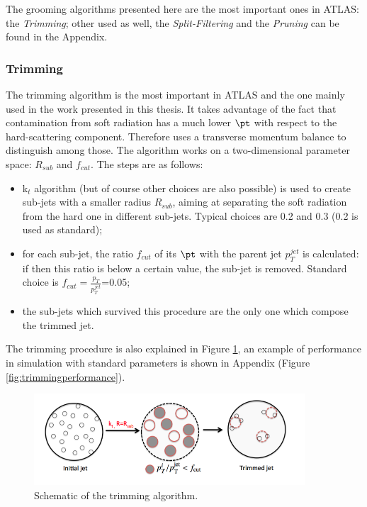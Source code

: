 The grooming algorithms presented here are the most important ones in ATLAS: the \textit{Trimming}; other used as well, the \textit{Split-Filtering} and the \textit{Pruning} can be found in the Appendix.

\subsubsection{Trimming}

The trimming algorithm is the most important in ATLAS and the one mainly used in the work presented in this thesis. It takes advantage of the fact that contamination from soft radiation has a much lower $\pt$ with respect to the hard-scattering component. Therefore uses a transverse momentum balance to distinguish among those. The algorithm works on a two-dimensional parameter space: $R_{sub}$ and $f_{cut}$.
The steps are as follows:
\begin{itemize}
 \item k$_t$ algorithm (but of course other choices are also possible) is used to create sub-jets with a smaller radius $R_{sub}$, aiming at separating the soft radiation from the hard one in different sub-jets. Typical choices are 0.2 and 0.3 (0.2 is used as standard);
 \item for each sub-jet, the ratio $f_{cut}$ of its $\pt$ with the parent jet $p_T^{jet}$ is calculated: if then this ratio is below a certain value, the sub-jet is removed. Standard choice is $f_{cut}=\frac{p_{T}}{p_{T}^{jet}}$=0.05;
 \item the sub-jets which survived this procedure are the only one which compose the trimmed jet.
\end{itemize}

The trimming procedure is also explained in Figure \ref{fig:trimming}, an example of performance in simulation with standard parameters is shown in Appendix (Figure \ref{fig:trimmingperformance}).

\begin{figure}[!ht]
  \centering
      \includegraphics[width=0.9\textwidth]{jet_part/grooming/Figura_4.png}
  \caption{Schematic of the trimming algorithm.}
  \label{fig:trimming}
\end{figure}


